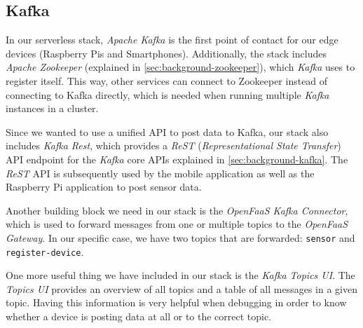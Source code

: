 \subsection{Kafka}

In our serverless stack, \textit{Apache Kafka} is the first point of contact for our edge devices
(Raspberry Pis and Smartphones). Additionally, the stack includes \textit{Apache Zookeeper}
(explained in \autoref{sec:background-zookeeper}), which \textit{Kafka} uses to register itself.
This way, other services can connect to Zookeeper instead of connecting to Kafka directly, which is
needed when running multiple \textit{Kafka} instances in a cluster.

Since we wanted to use a unified API to post data to Kafka, our stack also includes \textit{Kafka
Rest}, which provides a \textit{ReST} (\textit{Representational State Transfer}) API endpoint for
the \textit{Kafka} core APIs explained in \autoref{sec:background-kafka}. The \textit{ReST} API is
subsequently used by the mobile application as well as the Raspberry Pi application to post sensor
data.

Another building block we need in our stack is the \textit{OpenFaaS Kafka Connector}, which is used
to forward messages from one or multiple topics to the \textit{OpenFaaS Gateway}. In our specific
case, we have two topics that are forwarded: \texttt{sensor} and \texttt{register-device}.

One more useful thing we have included in our stack is the \textit{Kafka Topics UI}. The
\textit{Topics UI} provides an overview of all topics and a table of all messages in a given topic.
Having this information is very helpful when debugging in order to know whether a device is posting
data at all or to the correct topic.
